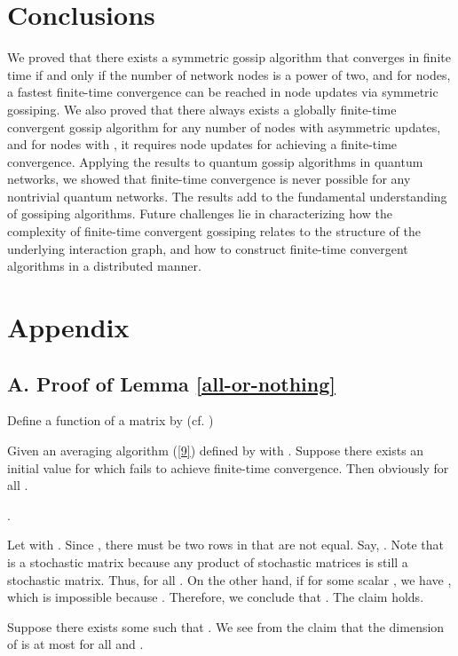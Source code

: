 \documentclass[a4paper, 11pt]{article}
\begin{document}
\section{Conclusions}\label{Sec:Conclusions}
We proved  that there exists a symmetric gossip algorithm that converges in finite time if and only if the number of network nodes is a power of two, and for  nodes,  a fastest finite-time convergence can be reached in  node updates via symmetric gossiping. We also proved that there always exists a globally finite-time convergent gossip algorithm for any number of nodes with asymmetric updates, and for  nodes with , it requires  node updates for achieving a finite-time convergence. Applying the results to quantum  gossip algorithms in quantum networks, we showed  that finite-time convergence is never possible for any nontrivial quantum networks. The results add to the  fundamental understanding of  gossiping algorithms. Future challenges lie in characterizing how the complexity of finite-time convergent gossiping relates to the structure of the underlying interaction graph, and how to construct  finite-time convergent  algorithms in a distributed manner.


\medskip

\medskip
\section*{Appendix}

\subsection*{A. Proof of Lemma \ref{all-or-nothing}}

Define a function  of a matrix  by (cf. \cite{Hajnal1958})


Given an averaging algorithm (\ref{9}) defined by  with . Suppose there exists an initial value  for which  fails to achieve finite-time convergence. Then  obviously  for all .

\vspace{2mm}
 .

Let  with . Since , there must be two  rows in  that are not equal. Say,    . Note that  is a stochastic matrix because any product of stochastic matrices is still a stochastic matrix. Thus,  for all . On the other hand, if  for some scalar , we have , which is impossible because . Therefore, we conclude that .  The claim holds.

\vspace{2mm}
Suppose there exists some  such that . We see from the claim that the dimension of   is at most  for all  and .
\end{document}
